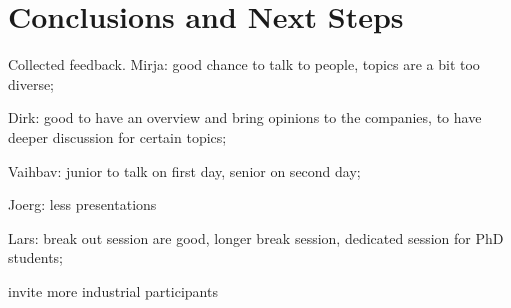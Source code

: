 \section{Conclusions and Next Steps}\label{sec:conclusion}

Collected feedback.  
Mirja: good chance to talk to people, 
topics are a bit too diverse;

Dirk:
good to have an overview and bring opinions to the companies,
to have deeper discussion for certain topics;

Vaihbav:
junior to talk on first day,
senior on second day;

Joerg:
less presentations

Lars:
break out session are good,
longer break session,
dedicated session for PhD students;

invite more industrial participants